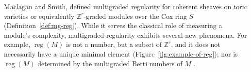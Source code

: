 \documentclass[11pt,reqno]{amsart}
\theoremstyle{remark}
\newcommand{\reg}{\operatorname{reg}}
\newcommand{\Pic}{\operatorname{Pic}}
\newcommand{\CC}{\mathbb{C}}
\newcommand{\ZZ}{\mathbb{Z}}
\begin{document}
 Maclagan and Smith, defined multigraded regularity for coherent sheaves on toric varieties or equivalently $\ZZ^r$-graded modules over the Cox ring $S$ (Definition~\ref{def:mg-reg}). While it serves the classical role of measuring a module's complexity, multigraded regularity exhibits several new phenomena. For example, $\reg(M)$ is not a number, but a subset of $\ZZ^r$, and it does not necessarily have a unique minimal element (Figure~\ref{fig:example-of-reg}); nor is $\reg(M)$ determined by the multigraded Betti numbers of $M$ \cite{bruceHellerSayrafi21}. 
 
 
\end{document}
